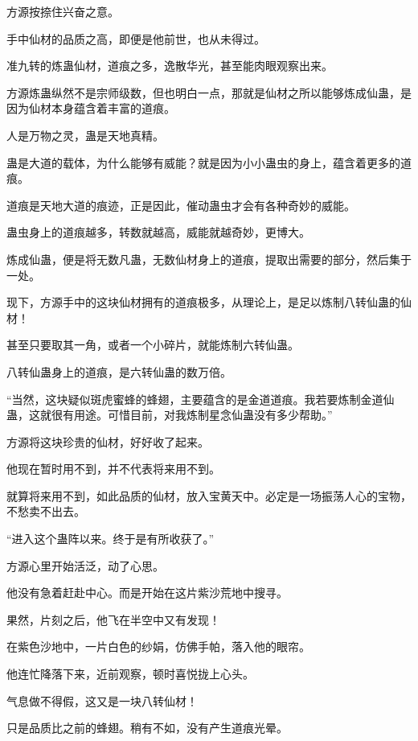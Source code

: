 
\begin{this_body}

方源按捺住兴奋之意。

手中仙材的品质之高，即便是他前世，也从未得过。

准九转的炼蛊仙材，道痕之多，逸散华光，甚至能肉眼观察出来。

方源炼蛊纵然不是宗师级数，但也明白一点，那就是仙材之所以能够炼成仙蛊，是因为仙材本身蕴含着丰富的道痕。

人是万物之灵，蛊是天地真精。

蛊是大道的载体，为什么能够有威能？就是因为小小蛊虫的身上，蕴含着更多的道痕。

道痕是天地大道的痕迹，正是因此，催动蛊虫才会有各种奇妙的威能。

蛊虫身上的道痕越多，转数就越高，威能就越奇妙，更博大。

炼成仙蛊，便是将无数凡蛊，无数仙材身上的道痕，提取出需要的部分，然后集于一处。

现下，方源手中的这块仙材拥有的道痕极多，从理论上，是足以炼制八转仙蛊的仙材！

甚至只要取其一角，或者一个小碎片，就能炼制六转仙蛊。

八转仙蛊身上的道痕，是六转仙蛊的数万倍。

“当然，这块疑似斑虎蜜蜂的蜂翅，主要蕴含的是金道道痕。我若要炼制金道仙蛊，这就很有用途。可惜目前，对我炼制星念仙蛊没有多少帮助。”

方源将这块珍贵的仙材，好好收了起来。

他现在暂时用不到，并不代表将来用不到。

就算将来用不到，如此品质的仙材，放入宝黄天中。必定是一场振荡人心的宝物，不愁卖不出去。

“进入这个蛊阵以来。终于是有所收获了。”

方源心里开始活泛，动了心思。

他没有急着赶赴中心。而是开始在这片紫沙荒地中搜寻。

果然，片刻之后，他飞在半空中又有发现！

在紫色沙地中，一片白色的纱娟，仿佛手帕，落入他的眼帘。

他连忙降落下来，近前观察，顿时喜悦拢上心头。

气息做不得假，这又是一块八转仙材！

只是品质比之前的蜂翅。稍有不如，没有产生道痕光晕。


\end{this_body}
